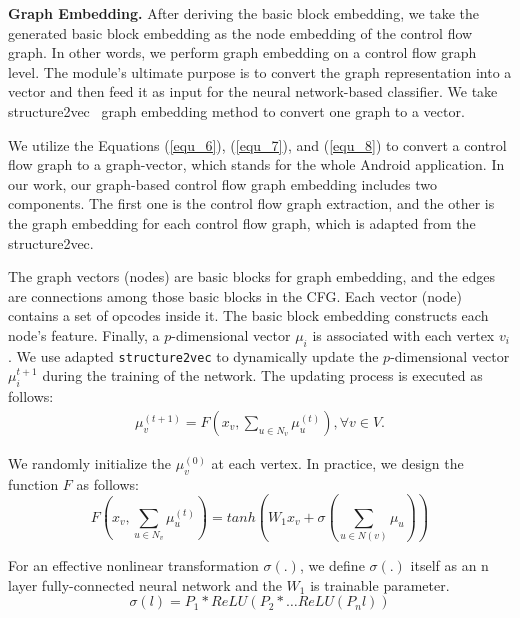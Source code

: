 \documentclass[runningheads]{llncs}
\begin{document}
\medskip \noindent \textbf{Graph Embedding.}
After deriving the basic block embedding, we take the generated basic block embedding as the node embedding of the control flow graph. In other words, we perform graph embedding on a control flow graph level. The module's ultimate purpose is to convert the graph representation into a vector and then feed it as input for the neural network-based classifier.
We take structure2vec~\cite{dai2016discriminative} graph embedding method to convert one graph to a vector.

We utilize the Equations (\ref{equ_6}), (\ref{equ_7}), and (\ref{equ_8}) to convert a control flow graph to a graph-vector, which stands for the whole Android application. In our work, our graph-based control flow graph embedding includes two components. The first one is the control flow graph extraction, and the other is the graph embedding for each control flow graph, which is adapted from the structure2vec.

The graph vectors (nodes) are basic blocks for graph embedding, and the edges are connections among those basic blocks in the CFG. Each vector (node) contains a set of opcodes inside it. The basic block embedding constructs each node's feature. Finally, a $p$-dimensional vector $\mu_i$ is associated with each vertex $v_i$. We use adapted \texttt{structure2vec} to dynamically update the $p$-dimensional vector $\mu_i^{t+1}$ during the training of the network. The updating process is executed as follows:
%
\begin{equation}
\begin{aligned}
\mu_v^{(t+1)} = F(x_v, \sum_{u \in N_{v} }\mu_u^{(t)}), \forall v \in V. 
\end{aligned}
\label{equ_6}
\end{equation}

We randomly initialize the $\mu_v^{(0)}$ at each vertex. In practice, we design the function $F$ as follows:
%
\begin{equation}
F(x_v, \sum_{u \in N_{v} }\mu_u^{(t)})=tanh(W_1x_v+\sigma(\sum_{u \in N(v)} \mu_u))
\label{equ_7}
\end{equation}

For an effective nonlinear transformation $\sigma(.)$, we define $\sigma(.)$ itself as an n layer fully-connected neural network and the $W_1$ is trainable parameter.
%
\begin{equation}
\sigma(l) = P_1 * ReLU(P_2 * \dots ReLU(P_nl))
\label{equ_8}
\end{equation} 
\end{document}
